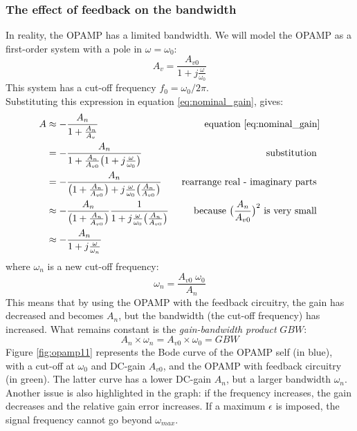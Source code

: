 \subsubsection{The effect of feedback on the bandwidth}
In reality, the OPAMP has a limited bandwidth. We will model the OPAMP as a first-order system with a pole in $\omega = \omega_0$:
$$
A_v = \frac{A_{v0}}{1 + j \frac{\omega}{\omega_0}}
$$
This system has a cut-off frequency $f_0 = \omega_0 /  2\pi $.\\
Substituting this expression in equation \ref{eq:nominal_gain}, gives:
\begin{align*}
	A &\approx -\frac{A_n}{1+\frac{A_n}{A_v}}  & \text{ equation \ref{eq:nominal_gain}}\\
	  &= -\frac{A_n}{1+\frac{A_n}{A_{v0}}\big(1 + j \frac{\omega}{\omega_0}\big)}   & \text{ substitution }\\
	  &= -\frac{A_n}{\big(1 + \frac{A_n}{A_{v0}}\big) + j \frac{\omega}{\omega_0} \big(\frac{A_n}{A_{v0}}\big)} & \text{ rearrange real - imaginary parts }\\
	  &\approx -\frac{A_n}{\big(1 + \frac{A_n}{A_{v0}}\big)}  
	  \frac{1}{1 + j \frac{\omega}{\omega_0} \big(\frac{A_n}{A_{v0}}\big)} & \text{ because } \big(\frac{A_n}{A_{v0}}\big)^2 \text{ is very small }\\
	  &\approx - \frac{A_n}{1 + j \frac{\omega}{\omega_n}}
\end{align*}
where $\omega_n$ is a new cut-off frequency:
$$
\omega_n = \frac{A_{v0} \; \omega_0}{A_n}
$$
This means that by using the OPAMP with the feedback circuitry, the gain has decreased and becomes $A_n$, but the bandwidth (the cut-off frequency) has increased. What remains constant is the \emph{gain-bandwidth product} $GBW$:
$$
A_n \times \omega_n = A_{v0} \times \omega_0 = GBW
$$
Figure \ref{fig:opamp11} represents the Bode curve of the OPAMP self (in blue), with a cut-off at $\omega_0$ and DC-gain $A_{v0}$, and the OPAMP with feedback circuitry (in green). The latter curve has a lower DC-gain $A_n$, but a larger bandwidth $\omega_n$. Another issue is also highlighted in the graph: if the frequency increases, the gain decreases and the relative gain error increases. If a maximum $\epsilon$ is imposed, the signal frequency cannot go beyond $\omega_{max}$.
